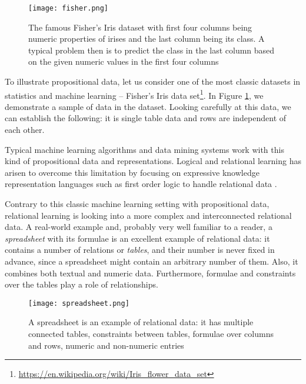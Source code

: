 \pubrev
\begin{figure}[thb]
  \begin{center}
    \texttt{[image: fisher.png]}
  \end{center}
  \caption{The famous Fisher's Iris dataset with first four columns
    being numeric properties of irises and the last column being its
    class. A typical problem then is to predict the class in the last
    column based on the given numeric values in the first four columns}
  \label{fig:iris}
\end{figure}


To illustrate propositional data, let us consider one of the most
classic datasets in statistics and machine learning -- Fisher's Iris
data
set\footnote{\url{https://en.wikipedia.org/wiki/Iris_flower_data_set}}.
In Figure \ref{fig:iris}, we demonstrate a sample of data in the
dataset. Looking carefully at this data, we can establish the
following: it is single table data and rows are independent of each other. 

Typical machine learning algorithms and data mining systems work with
this kind of propositional data and representations. Logical and relational learning has
arisen to overcome this limitation by focusing on expressive knowledge
representation languages such as first order logic to handle
relational data \parencite{luc_book}.

Contrary to this classic machine learning setting with propositional
data, relational learning is looking into a more complex and interconnected relational data. A real-world example and, probably very well familiar to a reader, a \textit{spreadsheet} with its formulae is an
excellent example of relational data: it contains a number of
relations or \textit{tables}, and their number is never fixed in
advance, since a spreadsheet might contain an arbitrary number of
them. Also, it combines both textual and numeric data. Furthermore,
formulae and constraints over the tables play a role of relationships.

\begin{figure}[thb]
  \begin{center}
    \texttt{[image: spreadsheet.png]}
  \end{center}
  \caption{A spreadsheet is an example of relational data: it has multiple connected tables, constraints between tables, formulae over columns and rows, numeric and non-numeric entries}
  \label{fig:spreadsheet_example_intro}
\end{figure}


